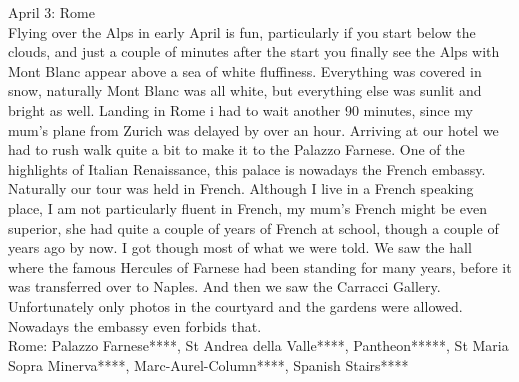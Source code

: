 April 3: Rome\\
Flying over the Alps in early April is fun, particularly if you start below the clouds, and just a couple of minutes after the start you finally see the Alps with Mont Blanc appear above a sea of white fluffiness. Everything was covered in snow, naturally Mont Blanc was all white, but everything else was sunlit and bright as well. Landing in Rome i had to wait another 90 minutes, since my mum's plane from Zurich was delayed by over an hour. Arriving at our hotel we had to rush walk quite a bit to make it to the Palazzo Farnese. One of the highlights of Italian Renaissance, this palace is nowadays the French embassy. Naturally our tour was held in French. Although I live in a French speaking place, I am not particularly fluent in French, my mum's French might be even superior, she had quite a couple of years of French at school, though a couple of years ago by now. I got though most of what we were told. We saw the hall where the famous Hercules of Farnese had been standing for many years, before it was transferred over to Naples. And then we saw the Carracci Gallery. Unfortunately only photos in the courtyard and the gardens were allowed. Nowadays the embassy even forbids that.\\

Rome: Palazzo Farnese****, St Andrea della Valle****, Pantheon*****, St Maria Sopra Minerva****, Marc-Aurel-Column****, Spanish Stairs****\\

